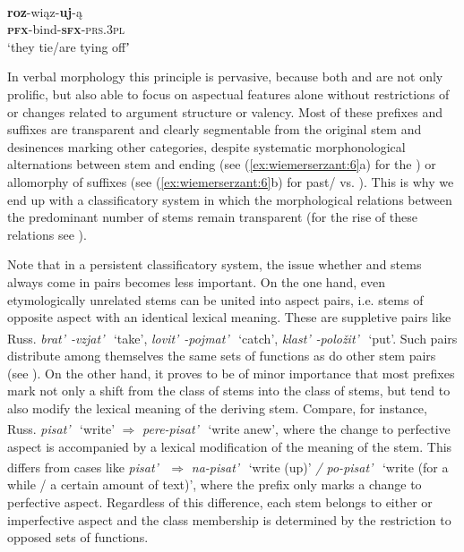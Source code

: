 \documentclass[output=paper]{langsci/langscibook}
\begin{document}
\gll \textbf{{roz}}{-wiąz-}\textbf{{uj}}{-ą}{\textsuperscript{~}\IPFV} \\
\textsc{\textbf{pfx}}-bind-\textsc{\textbf{sfx}}\textsc{-prs.3pl}\\
\glt ‘they tie/are tying offʼ
\z
\z

In  verbal morphology this principle is pervasive, because both  and  are not only prolific, but also able to focus on aspectual features alone without restrictions of  or changes related to argument structure or valency. Most of these prefixes and suffixes are transparent and clearly segmentable from the original stem and desinences marking other categories, despite systematic morphonological alternations between stem and  ending (see (\ref{ex:wiemerserzant:6}a) for the ) or allomorphy of suffixes (see (\ref{ex:wiemerserzant:6}b) for past/ vs. ). This is why we end up with a classificatory system in which the morphological relations between the predominant number of stems remain transparent (for the rise of these relations see ).

Note that in a persistent classificatory system, the issue whether  and  stems always come in pairs becomes less important. On the one hand, even etymologically unrelated stems can be united into aspect pairs, i.e. stems of opposite aspect with an identical lexical meaning. These are suppletive pairs like Russ. \textit{brat’}{\textsuperscript{~}\IPFV}\textit{-vzjat’}{\textsuperscript{~}\PFV} ‘take’, \textit{lovit’}{\textsuperscript{~}\IPFV}\textit{-pojmat’}{\textsuperscript{~}\PFV} ‘catch’, \textit{klast’}{\textsuperscript{~}\IPFV}\textit{-polo}\textit{žit}\textit{’}{\textsuperscript{~}\PFV} ‘put’. Such pairs distribute among themselves the same sets of functions as do other stem pairs (see ). On the other hand, it proves to be of minor importance that most  prefixes mark not only a shift from the class of  stems into the class of  stems, but tend to also modify the lexical meaning of the deriving stem. Compare, for instance, Russ. \textit{pisat’}{\textsuperscript{~}\IPFV} ‘write’ ${\Rightarrow}$ \textit{pere-pisat’}{\textsuperscript{~}\PFV} ‘write anew’, where the change to perfective aspect is accompanied by a lexical modification of the meaning of the  stem. This differs from cases like \textit{pisat’}{\textsuperscript{~}\IPFV} ${\Rightarrow}$ \textit{na-pisat’}{\textsuperscript{~}\PFV} ‘write (up)’ \textit{/ po-pisat’}{\textsuperscript{~}\PFV} ‘write (for a while / a certain amount of text)’, where the prefix only marks a change to perfective aspect. Regardless of this difference, each stem belongs to either  or imperfective aspect and the class membership is determined by the restriction to opposed sets of functions.
\end{document}
